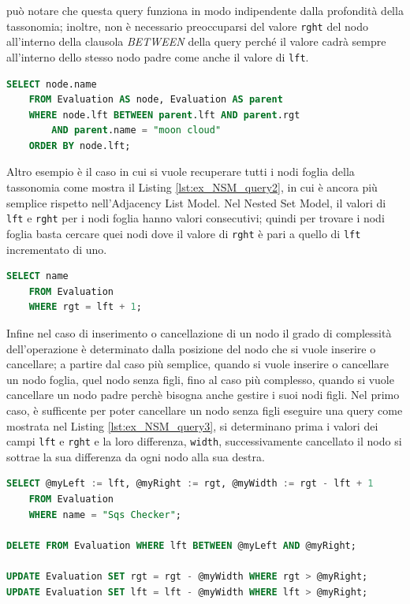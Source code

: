 può notare che questa query funziona in modo indipendente dalla profondità della tassonomia; inoltre, non è necessario preoccuparsi del valore \texttt{rght} 
del nodo all'interno della clausola \textit{BETWEEN} della query perché il valore cadrà sempre all'interno dello stesso nodo padre come anche il 
valore di \texttt{lft}.
\begin{lstlisting}[language=SQL, label=lst:ex_NSM_query, caption={Query in puro Sql per recuperare l'intera tassonomia delle Evaluation, 
    secondo il Nested Set Model.}]
SELECT node.name
    FROM Evaluation AS node, Evaluation AS parent
    WHERE node.lft BETWEEN parent.lft AND parent.rgt
        AND parent.name = "moon cloud"
    ORDER BY node.lft;
\end{lstlisting}
%
Altro esempio è il caso in cui si vuole recuperare tutti i nodi foglia della tassonomia come mostra il Listing \ref{lst:ex_NSM_query2}, in cui è ancora 
più semplice rispetto nell'Adjacency List Model. Nel Nested Set Model, il valori di \texttt{lft} e \texttt{rght} per i nodi foglia hanno valori 
consecutivi; quindi per trovare i nodi foglia basta cercare quei nodi dove il valore di \texttt{rght} è pari a quello di \texttt{lft} incrementato di uno.
\begin{lstlisting}[language=SQL, label=lst:ex_NSM_query2, caption={Query in puro Sql per recuperare tutti i nodi foglia della tassonomia delle Evaluation, 
    secondo il Nested Set Model.}]
SELECT name
    FROM Evaluation
    WHERE rgt = lft + 1;
\end{lstlisting}
%
Infine nel caso di inserimento o cancellazione di un nodo il grado di complessità dell'operazione è determinato dalla posizione del nodo che si 
vuole inserire o cancellare; a partire dal caso più semplice, quando si vuole inserire o cancellare un nodo foglia, quel nodo senza figli, fino 
al caso più complesso, quando si vuole cancellare un nodo padre perchè bisogna anche gestire i suoi nodi figli.
Nel primo caso, è sufficente per poter cancellare un nodo senza figli eseguire una query come mostrata nel Listing \ref{lst:ex_NSM_query3}, si determinano 
prima i valori dei campi \texttt{lft} e \texttt{rght} e la loro differenza, \texttt{width}, successivamente cancellato il nodo si sottrae la sua 
differenza da ogni nodo alla sua destra.
\begin{lstlisting}[language=SQL, label=lst:ex_NSM_query3, caption={Query in puro Sql per eliminare un nodo foglia dalla tassonomia delle Evaluation, 
    secondo il Nested Set Model.}]
SELECT @myLeft := lft, @myRight := rgt, @myWidth := rgt - lft + 1
    FROM Evaluation
    WHERE name = "Sqs Checker";

DELETE FROM Evaluation WHERE lft BETWEEN @myLeft AND @myRight;

UPDATE Evaluation SET rgt = rgt - @myWidth WHERE rgt > @myRight;
UPDATE Evaluation SET lft = lft - @myWidth WHERE lft > @myRight;
\end{lstlisting}
